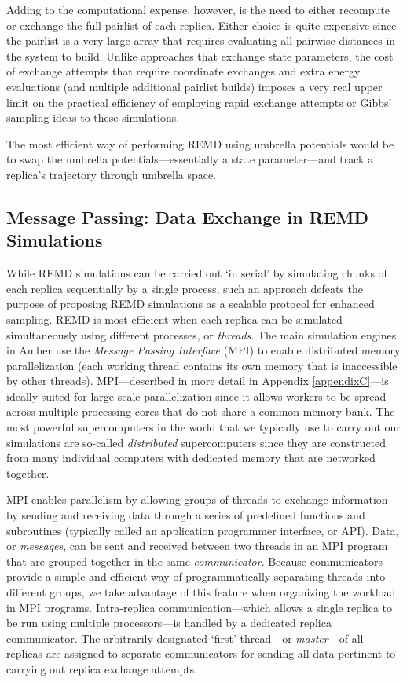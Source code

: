 Adding to the computational expense, however, is the need to either recompute or
exchange the full pairlist of each replica. Either choice is quite expensive
since the pairlist is a very large array that requires evaluating all pairwise
distances in the system to build. Unlike approaches that exchange state
parameters, the cost of exchange attempts that require coordinate exchanges and
extra energy evaluations (and multiple additional pairlist builds) imposes a
very real upper limit on the practical efficiency of employing rapid exchange
attempts or Gibbs' sampling ideas to these simulations.

The most efficient way of performing REMD using umbrella potentials would be to
swap the umbrella potentials---essentially a state parameter---and track a
replica's trajectory through umbrella space.

\subsection{Message Passing: Data Exchange in REMD Simulations}

While REMD simulations can be carried out `in serial' by simulating chunks of
each replica sequentially by a single process, such an approach defeats the
purpose of proposing REMD simulations as a scalable protocol for enhanced
sampling. REMD is most efficient when each replica can be simulated
simultaneously using different processes, or \emph{threads}. The main simulation
engines in Amber use the \emph{Message Passing Interface} (MPI) to enable
distributed memory parallelization (\ie each working thread contains its own
memory that is inaccessible by other threads). MPI---described in more detail in
Appendix \ref{appendixC}---is ideally suited for large-scale parallelization
since it allows workers to be spread across multiple processing cores that do
not share a common memory bank. The most powerful supercomputers in the world
that we typically use to carry out our simulations are so-called
\emph{distributed} supercomputers since they are constructed from many
individual computers with dedicated memory that are networked together.

MPI enables parallelism by allowing groups of threads to exchange information by
sending and receiving data through a series of predefined functions and
subroutines (typically called an application programmer interface, or API).
Data, or \emph{messages}, can be sent and received between two threads in an MPI
program that are grouped together in the same \emph{communicator}. Because
communicators provide a simple and efficient way of programmatically separating
threads into different groups, we take advantage of this feature when organizing
the workload in MPI programs. Intra-replica communication---which allows a
single replica to be run using multiple processors---is handled by a dedicated
replica communicator. The arbitrarily designated `first' thread---or
\emph{master}---of all replicas are assigned to separate communicators for
sending all data pertinent to carrying out replica exchange attempts.

